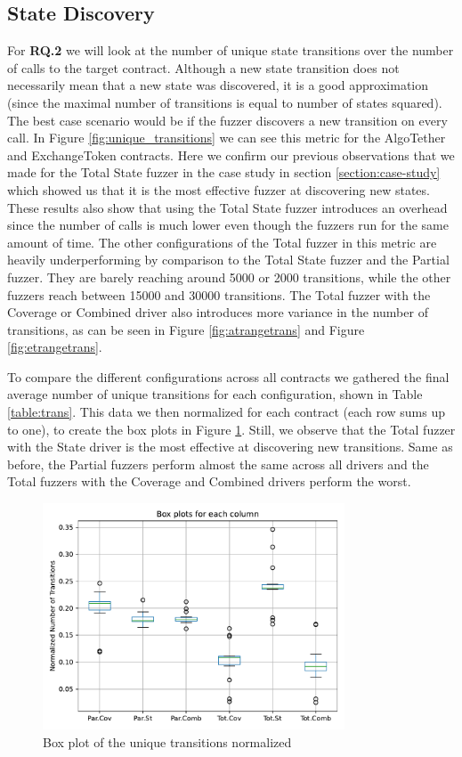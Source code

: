 \subsection*{State Discovery}
For \textbf{RQ.2} we will look at the number of unique state transitions over the number of calls to the target contract.
Although a new state transition does not necessarily mean that a new state was discovered, it is a good approximation (since the maximal number of transitions is equal to number of states squared).
The best case scenario would be if the fuzzer discovers a new transition on every call.
In Figure \ref{fig:unique_transitions} we can see this metric for the AlgoTether and ExchangeToken contracts.
Here we confirm our previous observations that we made for the Total State fuzzer in the case study in section \ref{section:case-study} which showed us that it is the most effective fuzzer at discovering new states.
These results also show that using the Total State fuzzer introduces an overhead since the number of calls is much lower even though the fuzzers run for the same amount of time.
The other configurations of the Total fuzzer in this metric are heavily underperforming by comparison to the Total State fuzzer and the Partial fuzzer. They are barely reaching around 5000 or 2000 transitions, while the other fuzzers reach between 15000 and 30000 transitions. The Total fuzzer with the Coverage or Combined driver also introduces more variance in the number of transitions, as can be seen in Figure \ref{fig:atrangetrans} and Figure \ref{fig:etrangetrans}.

To compare the different configurations across all contracts we gathered the final average number of unique transitions for each configuration, shown in Table \ref{table:trans}.
This data we then normalized for each contract (each row sums up to one), to create the box plots in Figure \ref{fig:trans-box}.
Still, we observe that the Total fuzzer with the State driver is the most effective at discovering new transitions. Same as before, the Partial fuzzers perform almost the same across all drivers and the Total fuzzers with the Coverage and Combined drivers perform the worst.





\begin{figure}[t]
    \centering
    \includegraphics*[width=0.8\textwidth]{charts/trans-box.pdf}
    \caption{Box plot of the unique transitions normalized}\label{fig:trans-box}
\end{figure}

